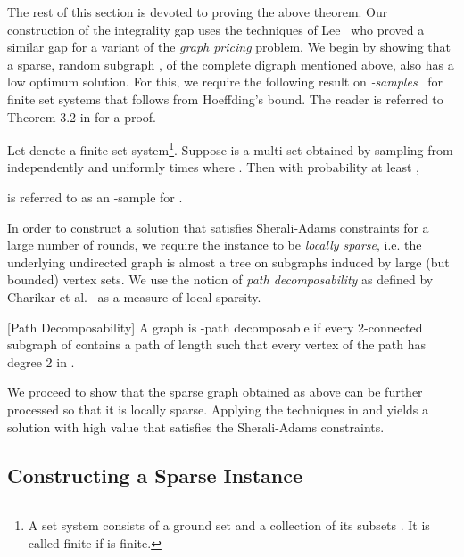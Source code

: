 \documentclass[oribibl]{llncs}
\begin{document}
The rest of this section is devoted to proving the above theorem.  Our
construction of the integrality gap uses the techniques of 
Lee~\cite{lee2014hardness} who proved a similar gap for a variant of the 
\emph{graph pricing} problem. We begin by 
showing that a sparse, random subgraph ,
of the complete digraph  mentioned above,
also has a low optimum solution. For this, we require the following
result on \emph{-samples}~\cite{VC} for finite set systems that
follows from Hoeffding's bound. The reader is referred 
to Theorem 3.2 in \cite{lect} for a proof.
\begin{theorem}
\label{thm:epsilonsample}
  Let  denote a finite set system\footnote{A set system  consists of a
	  ground set  and a collection of its subsets
	  . It is called finite
  if  is finite.}. Suppose
   is a multi-set obtained by sampling
  from  independently and uniformly  times where . Then
  with probability at least ,
   
   is referred to as an -sample for
  .
\end{theorem}
In order to construct a solution that satisfies Sherali-Adams
constraints for a large number of rounds, 
we require the instance to be \emph{locally sparse}, i.e. the
underlying undirected graph is
almost a tree on subgraphs induced by large (but bounded) 
vertex sets. We use the notion of \emph{path decomposability} 
as defined by 
Charikar et al.~\cite{charikar2009integrality} as a measure of local
sparsity.
\begin{definition}\textnormal{[Path Decomposability]} A graph  is
	-path decomposable if every 2-connected subgraph  of 
	contains a path of length  such that every 
	vertex of the path has degree 2 in .  
\end{definition}
We proceed to show that the sparse graph  obtained as above can be
further processed so that it is locally sparse. Applying the
techniques in \cite{charikar2009integrality} and 
\cite{lee2014hardness} yields a solution with high value that
satisfies the Sherali-Adams constraints.

\subsection{Constructing a Sparse Instance}
\label{sec:constr-sparse-inst}
\end{document}
